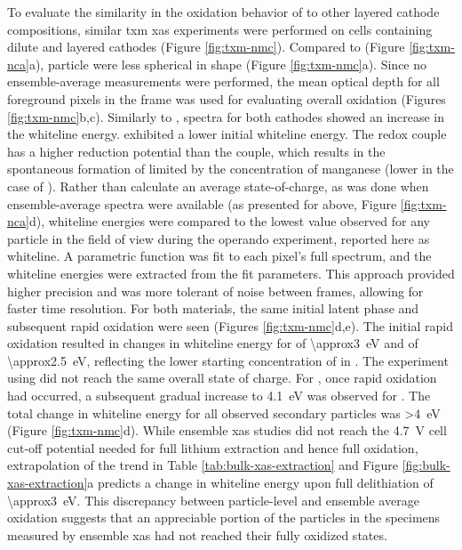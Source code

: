 \documentclass{article}
\begin{document}
To evaluate the similarity in the oxidation behavior of \nca{} to
other layered cathode compositions, similar \gls{txm} \gls{xas}
experiments were performed on cells containing dilute \nmc[333]{} and
\nmc[532]{} layered cathodes (Figure \ref{fig:txm-nmc}). Compared to
\nca{} (Figure \ref{fig:txm-nca}a), \nmc{} particle were less
spherical in shape (Figure \ref{fig:txm-nmc}a). Since no
ensemble-average measurements were performed, the mean optical depth
for all foreground pixels in the frame was used for evaluating overall
oxidation (Figures \ref{fig:txm-nmc}b,c). Similarly to \nca{}, spectra
for both \nmc{} cathodes showed an increase in the whiteline
energy. \nmc[333]{} exhibited a lower initial whiteline energy. The
 redox couple has a higher reduction potential than
the  couple, which results in the spontaneous
formation of  limited by the concentration of manganese
(lower in the case of \nmc[532]{}). Rather than calculate an average
state-of-charge, as was done when ensemble-average spectra were
available (as presented for \nca{} above, Figure \ref{fig:txm-nca}d),
whiteline energies were compared to the lowest value observed for any
particle in the field of view during the operando experiment, reported
here as \textDelta{}whiteline. A parametric function was fit to each
pixel's full spectrum, and the whiteline energies were extracted from
the fit parameters. This approach provided higher precision and was
more tolerant of noise between frames, allowing for faster time
resolution. For both \nmc{} materials, the same initial latent phase
and subsequent rapid oxidation were seen (Figures
\ref{fig:txm-nmc}d,e). The initial rapid  oxidation resulted in
changes in whiteline energy for \nmc[333]{} of
\SI{\approx3}{\electronvolt} and \nmc[532]{} of
\SI{\approx2.5}{\electronvolt}, reflecting the lower starting
concentration of  in \nmc[532]{}. The experiment using
\nmc[532]{} did not reach the same overall state of charge. For
\nmc[333]{}, once rapid oxidation had occurred, a subsequent gradual
increase to \SI{4.1}{eV} was observed for \nmc[333]{}. The total
change in whiteline energy for all observed secondary particles was
\SI{>4}{eV} (Figure \ref{fig:txm-nmc}d). While ensemble \gls{xas}
studies\cite{deb2005,muto2009} did not reach the \SI{4.7}{V} cell
cut-off potential needed for full lithium extraction and hence full
 oxidation, extrapolation of the trend in Table
\ref{tab:bulk-xas-extraction} and Figure
\ref{fig:bulk-xas-extraction}a predicts a change in whiteline energy
upon full delithiation of \SI{\approx3}{eV}. This discrepancy between
particle-level and ensemble average  oxidation suggests that an
appreciable portion of the particles in the specimens measured by
ensemble \gls{xas} had not reached their fully oxidized states.
\end{document}
